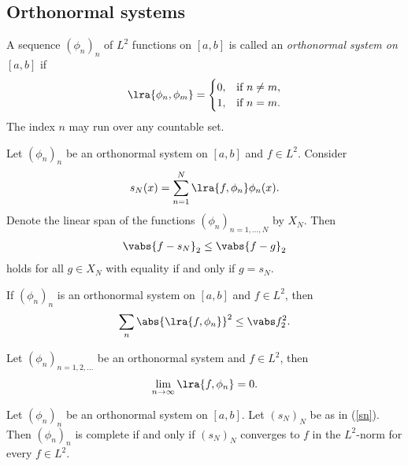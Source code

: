 \documentclass{article}
\begin{document}
\subsection{Orthonormal systems}

\begin{definition}[Notes 5.4]
    A sequence $(\phi_n)_n$ of $L^2$ functions on $[a,b]$ is called an \emph{orthonormal system on $[a,b]$}
    if 
    \begin{align*}
        \lra{\phi_n, \phi_m} = \begin{cases}
            0, &\text{if }n\not=m,\\
            1, &\text{if }n=m.
        \end{cases}
    \end{align*}
    The index $n$ may run over any countable set.
\end{definition}

\begin{theorem}[Notes 5.2]
    Let $(\phi_n)_n$ be an orthonormal system on $[a,b]$ and $f\in L^2$. Consider
    \begin{align}
        \label{sn}
        s_N(x) = \sum_{n=1}^N \lra{f,\phi_n}\phi_n(x).
    \end{align}
    Denote the linear span of the functions $(\phi_n)_{n=1,...,N}$ by $X_N$. Then 
    \begin{align*}
        \vabs{f-s_N}_2 \leq \vabs{f-g}_2
    \end{align*}
    holds for all $g\in X_N$ with equality if and only if $g=s_N$.
\end{theorem}

\begin{theorem}
    If $(\phi_n)_n$ is an orthonormal system on $[a,b]$ and $f\in L^2$, then 
    \begin{align*}
        \sum_n \abs{\lra{f,\phi_n}}^2 \leq \vabs f_2^2.
    \end{align*} 
\end{theorem}

\begin{corollary}
    Let $(\phi_n)_{n=1,2,...}$ be an orthonormal system and $f\in L^2$, then 
    \begin{align*}
        \lim_{n\to\infty} \lra{f,\phi_n}=0.
    \end{align*} 
\end{corollary}

\begin{theorem}[Notes 5.4]
    Let $(\phi_n)_n$ be an orthonormal system on $[a,b]$. Let $(s_N)_N$ be as in (\ref{sn}).
    Then $(\phi_n)_n$ is complete if and only if $(s_N)_N$ converges to $f$ in the $L^2$-norm 
    for every $f\in L^2$.
\end{theorem}
\end{document}
